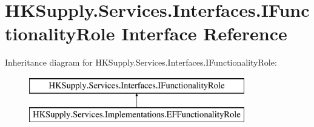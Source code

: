 \hypertarget{interface_h_k_supply_1_1_services_1_1_interfaces_1_1_i_functionality_role}{}\section{H\+K\+Supply.\+Services.\+Interfaces.\+I\+Functionality\+Role Interface Reference}
\label{interface_h_k_supply_1_1_services_1_1_interfaces_1_1_i_functionality_role}
Inheritance diagram for H\+K\+Supply.\+Services.\+Interfaces.\+I\+Functionality\+Role\+:\begin{figure}[H]
\begin{center}
\leavevmode
\includegraphics[height=2.000000cm]{interface_h_k_supply_1_1_services_1_1_interfaces_1_1_i_functionality_role}
\end{center}
\end{figure}
